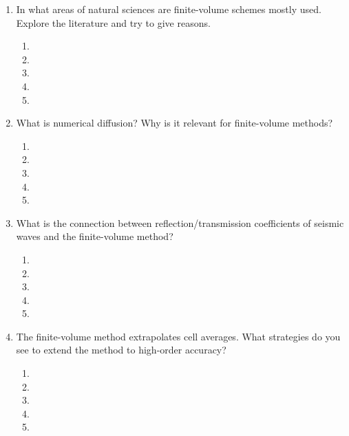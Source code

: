 \begin{enumerate}
\begin{enumerate}
\item[]
\item[]
\item[] 
\item[]
\item[] 
\end{enumerate}
\item In what areas of natural sciences are finite-volume schemes mostly used. Explore the literature and try to give reasons.
\begin{enumerate}
\item[]
\item[]
\item[] 
\item[]
\item[] 
\end{enumerate}
\item What is numerical diffusion? Why is it relevant for finite-volume methods?
\begin{enumerate}
\item[]
\item[]
\item[] 
\item[]
\item[] 
\end{enumerate}
\item What is the connection between reflection/transmission coefficients of seismic waves and the finite-volume method? 
\begin{enumerate}
\item[]
\item[]
\item[] 
\item[]
\item[] 
\end{enumerate}
\item The finite-volume method extrapolates cell averages. What strategies do you see to extend the method to high-order accuracy?
\begin{enumerate}
\item[]
\item[]
\item[] 
\item[]
\item[] 
\end{enumerate}
\end{enumerate}

